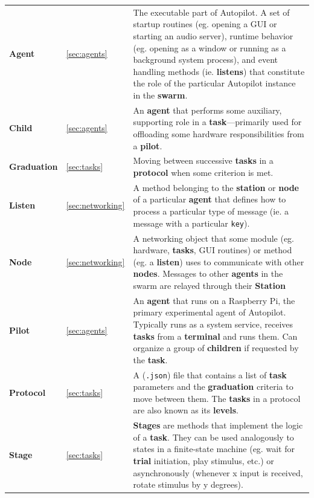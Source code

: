 \documentclass[nohyper, justified, notitlepage, marginals=raggedright,twoside=false,debug]{tufte-autopilot}
\begin{document}
\begin{fullwidth}
\renewcommand{\arraystretch}{1.25}
\begin{table}[!hb]
\noindent\begin{tabularx}{\linewidth}{llX}

 \textbf{Agent} & \ref{sec:agents} & The executable part of Autopilot. A set of startup routines (eg. opening a GUI or starting an audio server), runtime behavior (eg. opening as a window or running as a background system process), and event handling methods (ie. \textbf{listens}) that constitute the role of the particular Autopilot instance in the \textbf{swarm}. \\
 \textbf{Child} & \ref{sec:agents} & An \textbf{agent} that performs some auxiliary, supporting role in a \textbf{task}---primarily used for offloading some hardware responsibilities from a \textbf{pilot}. \\
 \textbf{Graduation} & \ref{sec:tasks} & Moving between successive \textbf{tasks} in a \textbf{protocol} when some criterion is met.  \\
 \textbf{Listen} & \ref{sec:networking} & A method belonging to the \textbf{station} or \textbf{node} of a particular \textbf{agent} that defines how to process a particular type of message (ie. a message with a particular \texttt{key}). \\
 \textbf{Node} & \ref{sec:networking} & A networking object that some module (eg. hardware, \textbf{tasks}, GUI routines) or method (eg. a \textbf{listen}) uses to communicate with other \textbf{nodes}. Messages to other \textbf{agents} in the swarm are relayed through their \textbf{Station} \\
 \textbf{Pilot} & \ref{sec:agents} & An \textbf{agent} that runs on a Raspberry Pi, the primary experimental agent of Autopilot. Typically runs as a system service, receives \textbf{tasks} from a \textbf{terminal} and runs them. Can organize a group of \textbf{children} if requested by the \textbf{task}. \\
 \textbf{Protocol} & \ref{sec:tasks} & A (\texttt{.json}) file that contains a list of \textbf{task} parameters and the \textbf{graduation} criteria to move between them. The \textbf{tasks} in a protocol are also known as its \textbf{levels}.  \\
 \textbf{Stage} & \ref{sec:tasks} & \textbf{Stages} are methods that implement the logic of a \textbf{task}. They can be used analogously to states in a finite-state machine (eg. wait for \textbf{trial} initiation, play stimulus, etc.) or asynchronously (whenever x input is received, rotate stimulus by y degrees). \\

\end{tabularx}
\end{table}
\end{fullwidth}
\end{document}
